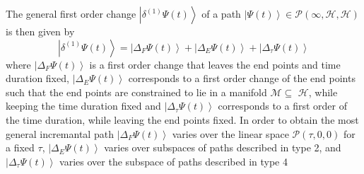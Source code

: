 \documentclass[aps,preprint]{revtex4}
\begin{document}
The general first order change $\left\vert \delta ^{\left( 1\right) }\Psi
\left( t\right) \right\rangle $ of a path $\left\vert \Psi \left( t\right)
\right\rangle \in \mathcal{P}\left( \infty ,\mathcal{H},\mathcal{H}\right) $
is then given by 
\begin{equation}
\left\vert \delta ^{\left( 1\right) }\Psi \left( t\right) \right\rangle
=\left\vert \Delta _{F}\Psi \left( t\right) \right\rangle +\left\vert \Delta
_{E}\Psi \left( t\right) \right\rangle +\left\vert \Delta _{\tau }\Psi
\left( t\right) \right\rangle 
\end{equation}%
where $\left\vert \Delta _{F}\Psi \left( t\right) \right\rangle $ is a first
order change that leaves the end points and time duration fixed, $\left\vert
\Delta _{E}\Psi \left( t\right) \right\rangle $ corresponds to a first order
change of the end points such that the end points are constrained to lie in
a manifold $\mathcal{M}\subseteq $ $\mathcal{H}$, while keeping the time
duration fixed and $\left\vert \Delta _{\tau }\Psi \left( t\right)
\right\rangle $ corresponds to a first order of the time duration, while
leaving the end points fixed. In order to obtain the most general
incremantal path $\left\vert \Delta _{F}\Psi \left( t\right) \right\rangle $
varies over the linear space $\mathcal{P}\left( \tau ,0,0\right) $ for a
fixed $\tau $, $\left\vert \Delta _{E}\Psi \left( t\right) \right\rangle $
varies over subspaces of paths described in type 2, and $\left\vert \Delta
_{\tau }\Psi \left( t\right) \right\rangle $ varies over the subspace of
paths described in type 4
\end{document}
